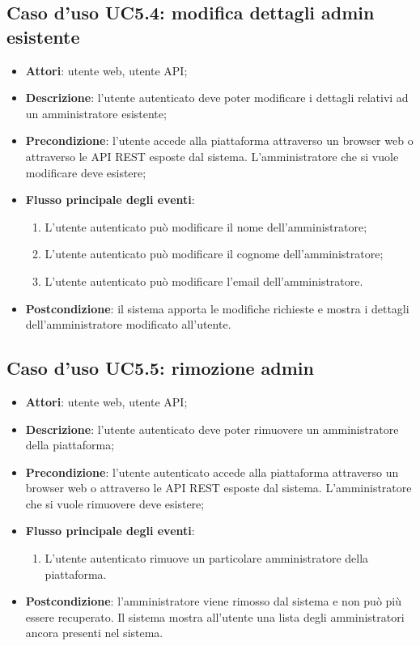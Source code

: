 \subsection{Caso d'uso UC5.4: modifica dettagli admin esistente}
\begin{itemize}
\item \textbf{Attori}: utente web, utente API;
\item \textbf{Descrizione}: l'utente autenticato deve poter modificare i dettagli relativi ad un amministratore esistente; 
      \item \textbf{Precondizione}: l'utente accede alla piattaforma attraverso un browser web o attraverso le API REST esposte dal sistema. L'amministratore che si vuole modificare deve esistere;

        \item \textbf{Flusso principale degli eventi}:
          \begin{enumerate}
          \item L'utente autenticato può modificare il nome dell'amministratore;
          \item L'utente autenticato può modificare il cognome dell'amministratore;
          \item L'utente autenticato può modificare l'email dell'amministratore.

      \end{enumerate}
    \item \textbf{Postcondizione}: il sistema apporta le modifiche richieste e mostra i dettagli dell'amministratore modificato all'utente.
  \end{itemize}
\hypertarget{UC5.5}{}
\subsection{Caso d'uso UC5.5: rimozione admin}
\begin{itemize}
\item \textbf{Attori}: utente web, utente API;
\item \textbf{Descrizione}: l'utente autenticato deve poter rimuovere un amministratore della piattaforma; 
      \item \textbf{Precondizione}: l'utente autenticato accede alla piattaforma attraverso un browser web o attraverso le API REST esposte dal sistema. L'amministratore che si vuole rimuovere deve esistere;

        \item \textbf{Flusso principale degli eventi}:
          \begin{enumerate}
          \item L'utente autenticato rimuove un particolare amministratore della piattaforma.

      \end{enumerate}
    \item \textbf{Postcondizione}: l'amministratore viene rimosso dal sistema e non può più essere recuperato. Il sistema mostra all'utente una lista degli amministratori ancora presenti nel sistema.
  \end{itemize}
\hypertarget{UC6}{}
